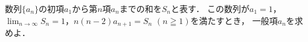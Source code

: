 \documentclass[../../main.tex]{subfiles}
\begin{document}
数列$\{ a_n \}$の初項$a_1$から第$n$項$a_n$までの和を$S_n$と表す．
この数列が$a_1=1$，$\displaystyle\lim_{n\to\infty}S_n=1$，$n(n-2)a_{n+1}=S_n$ $(n \geqq 1)$を満たすとき，
一般項$a_n$を求めよ．
\end{document}
